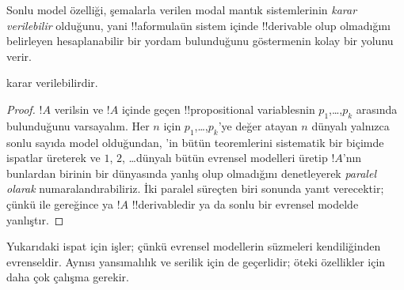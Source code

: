\documentclass[../../../include/open-logic-section]{subfiles}
\begin{document}

Sonlu model özelliği, şemalarla verilen modal mantık sistemlerinin
\emph{karar verilebilir} olduğunu, yani !!a{formula}{}ün sistem içinde
!!{derivable} olup olmadığını belirleyen hesaplanabilir bir yordam
bulunduğunu göstermenin kolay bir yolunu verir.

\begin{thm}
   karar verilebilirdir.
\end{thm}

\begin{proof}
  $!A$ verilsin ve $!A$ içinde geçen !!{propositional variable}s{}nin
  $p_1$,\dots,$p_k$ arasında bulunduğunu varsayalım. Her $n$ için
  $p_1$,\dots,$p_k$'ye değer atayan $n$ dünyalı yalnızca sonlu sayıda model
  olduğundan, 'in bütün teoremlerini sistematik bir biçimde
  ispatlar üreterek ve $1$, $2$, \dots dünyalı bütün evrensel modelleri üretip
  $!A$'nın bunlardan birinin bir dünyasında yanlış olup olmadığını denetleyerek
  \emph{paralel olarak} numaralandırabiliriz. İki paralel süreçten biri
  sonunda yanıt verecektir; çünkü
   ile  gereğince ya
  $!A$ !!{derivable}{}dir ya da sonlu bir evrensel modelde yanlıştır.
\end{proof}

Yukarıdaki ispat  için işler; çünkü evrensel modellerin süzmeleri
kendiliğinden evrenseldir. Aynısı yansımalılık ve serilik için de geçerlidir;
öteki özellikler için daha çok çalışma gerekir.
\end{document}
